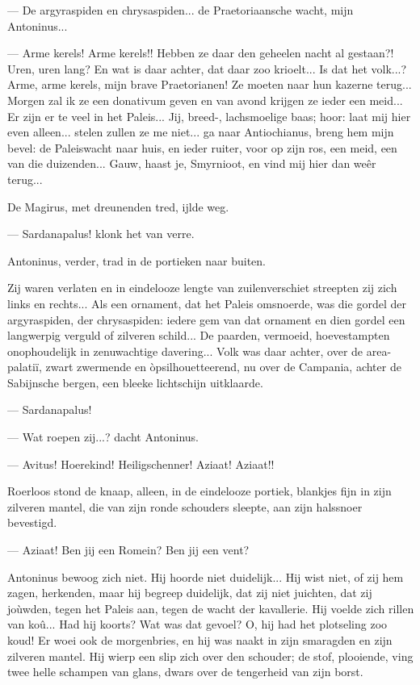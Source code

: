 \documentclass[a4paper, 12pt, oneside, dutch]{article}
\begin{document}
--- De argyraspiden en chrysaspiden... de Praetoriaansche wacht, mijn Antoninus...

--- Arme kerels! Arme kerels!! Hebben ze daar den geheelen nacht al gestaan?! Uren, uren lang? En wat is daar achter, dat daar zoo krioelt... Is dat het volk...? Arme, arme kerels, mijn brave Praetorianen! Ze moeten naar hun kazerne terug... Morgen zal ik ze een donativum geven en van avond krijgen ze ieder een meid... Er zijn er te veel in het Paleis... Jij, breed-, lachsmoelige baas; hoor: laat mij hier even alleen... stelen zullen ze me niet... ga naar Antiochianus, breng hem mijn bevel: de Paleiswacht naar huis, en ieder ruiter, voor op zijn ros, een meid, een van die duizenden... Gauw, haast je, Smyrnioot, en vind mij hier dan weêr terug...

De Magirus, met dreunenden tred, ijlde weg.

--- Sardanapalus! klonk het van verre.

Antoninus, verder, trad in de portieken naar buiten.

Zij waren verlaten en in eindelooze lengte van zuilenverschiet streepten zij zich links en rechts... Als een ornament, dat het Paleis omsnoerde, was die gordel der argyraspiden, der chrysaspiden: iedere gem van dat ornament en dien gordel een langwerpig verguld of zilveren schild... De paarden, vermoeid, hoevestampten onophoudelijk in zenuwachtige davering... Volk was daar achter, over de area-palatiï, zwart zwermende en òpsilhouetteerend, nu over de Campania, achter de Sabijnsche bergen, een bleeke lichtschijn uitklaarde.

--- Sardanapalus!

--- Wat roepen zij...? dacht Antoninus.

--- Avitus! Hoerekind! Heiligschenner! Aziaat! Aziaat!!

Roerloos stond de knaap, alleen, in de eindelooze portiek, blankjes fijn in zijn zilveren mantel, die van zijn ronde schouders sleepte, aan zijn halssnoer bevestigd.

--- Aziaat! Ben jij een Romein? Ben jij een vent?

Antoninus bewoog zich niet. Hij hoorde niet duidelijk... Hij wist niet, of zij hem zagen, herkenden, maar hij begreep duidelijk, dat zij niet juichten, dat zij joùwden, tegen het Paleis aan, tegen de wacht der kavallerie. Hij voelde zich rillen van koû... Had hij koorts? Wat was dat gevoel? O, hij had het plotseling zoo koud! Er woei ook de morgenbries, en hij was naakt in zijn smaragden en zijn zilveren mantel. Hij wierp een slip zich over den schouder; de stof, plooiende, ving twee helle schampen van glans, dwars over de tengerheid van zijn borst.
\end{document}
